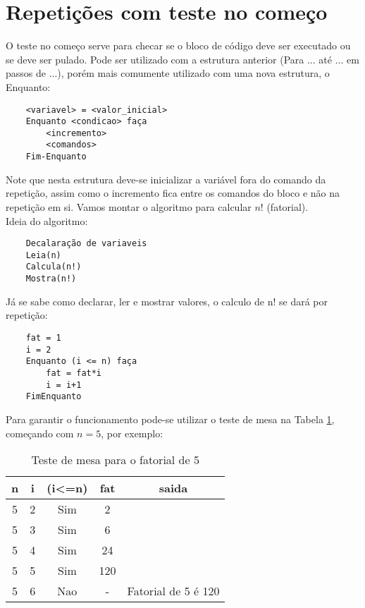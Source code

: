 \section{Repetições com teste no começo}
O teste no começo serve para checar se o bloco de código deve ser executado ou se deve ser pulado. Pode ser utilizado com a estrutura anterior (Para ... até ... em passos de ...), porém mais comumente utilizado com uma nova estrutura, o Enquanto: \\
\begin{lstlisting}
    <variavel> = <valor_inicial>
    Enquanto <condicao> faça
        <incremento>
        <comandos>
    Fim-Enquanto
\end{lstlisting}
Note que nesta estrutura deve-se inicializar a variável fora do comando da repetição, assim como o incremento fica entre os comandos do bloco e não na repetição em si. Vamos montar o algoritmo para calcular $n!$ (fatorial). \\
Ideia do algoritmo:
\begin{lstlisting}
    Decalaração de variaveis
    Leia(n)
    Calcula(n!)
    Mostra(n!)
\end{lstlisting}
Já se sabe como declarar, ler e mostrar valores, o calculo de n! se dará por repetição:
\begin{lstlisting}
    fat = 1
    i = 2
    Enquanto (i <= n) faça
        fat = fat*i
        i = i+1
    FimEnquanto
\end{lstlisting}
Para garantir o funcionamento pode-se utilizar o teste de mesa na Tabela \ref{tab:testefatorial}, começando com $n = 5$, por exemplo:
\begin{table}[!h]
    \centering
    \caption{Teste de mesa para o fatorial de 5}
    \label{tab:testefatorial}
    \begin{tabular}{ccccc} \hline \hline
    n & i & (i\textless=n) & fat & saida               \\ \hline
    5 & 2 & Sim            & 2   &                     \\
    5 & 3 & Sim            & 6   &                     \\
    5 & 4 & Sim            & 24  &                     \\
    5 & 5 & Sim            & 120 &                     \\
    5 & 6 & Nao            & -   & Fatorial de 5 é 120 \\ \hline \hline
    \end{tabular}
    \end{table}
